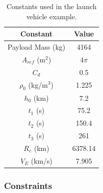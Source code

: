 \documentclass[10pt]{article}
\begin{document}

\begin{table}[htdp]
\caption{Constants used in the launch vehicle example.}
\begin{center}
\begin{tabular}{|c|c|}
\hline
Constant & Value \\
\hline \hline
Payload Mass (kg) & 4164 \\
\hline
$A_{ref}$ (m${}^2$) & $4\pi$ \\
\hline
$C_d$ & 0.5 \\
\hline
$\rho_0$ (kg/m${}^3$)& 1.225 \\
\hline
$h_0$ (km) & 7.2\\
\hline
$t_1$ (s) & 75.2 \\
\hline
 $t_2$ (s) & 150.4 \\
\hline
 $t_3$ (s) & 261 \\
\hline
 $R_e$ (km) & 6378.14 \\
\hline
 $V_E$ (km/s) & 7.905\\
\hline
\end{tabular}
\end{center}
\label{dynamics properties}
\end{table}

\subsubsection{Constraints}
\end{document}

